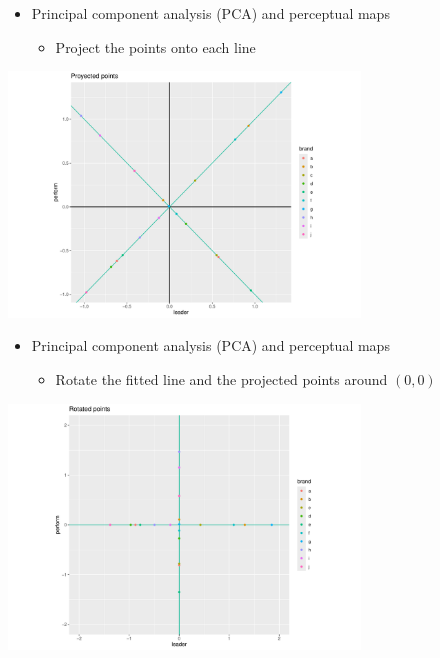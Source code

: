 \documentclass[
  ignorenonframetext,
]{beamer}
\providecommand{\tightlist}{%
  \setlength{\itemsep}{0pt}\setlength{\parskip}{0pt}}\usepackage{longtable,booktabs,array}
\begin{document}
\begin{frame}{}
\label{section-18}
\begin{itemize}
\item
  Principal component analysis (PCA) and perceptual maps

  \begin{itemize}
  \tightlist
  \item
    Project the points onto each line
  \end{itemize}
\end{itemize}

\begin{center}
\includegraphics[width=0.7\textwidth,height=\textheight]{008_reducing_data_complexity_files/figure-beamer/unnamed-chunk-17-1.pdf}
\end{center}
\end{frame}

\begin{frame}{}
\label{section-19}
\begin{itemize}
\item
  Principal component analysis (PCA) and perceptual maps

  \begin{itemize}
  \tightlist
  \item
    Rotate the fitted line and the projected points around \((0,0)\)
  \end{itemize}
\end{itemize}

\begin{center}
\includegraphics[width=0.7\textwidth,height=\textheight]{008_reducing_data_complexity_files/figure-beamer/unnamed-chunk-18-1.pdf}
\end{center}
\end{frame}
\end{document}

